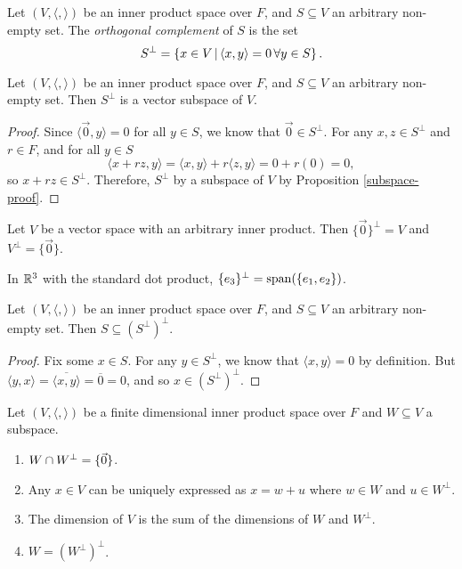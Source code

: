 \begin{defn}
    Let $(V, \langle,\rangle)$ be an inner product space over $F$, and $S \subseteq V$ an arbitrary non-empty set. The \emph{orthogonal complement} of $S$ is the set
    \[S^{\perp} = \left\{x \in V \,\middle|\, \langle x, y \rangle = 0 \,\forall y \in S \right\}.\]
\end{defn}

\begin{lemma}\label{orthogonal-complement-is-subspace}
    Let $(V, \langle,\rangle)$ be an inner product space over $F$, and $S \subseteq V$ an arbitrary non-empty set. Then $S^{\perp}$ is a vector subspace of $V$.
\end{lemma}

\begin{proof}
    Since $\langle \vec{0}, y \rangle = 0$ for all $y \in S$, we know that $\vec{0} \in S^{\perp}$. For any $x, z \in S^{\perp}$ and $r \in F$, and for all $y \in S$
    \[\langle x + rz, y \rangle = \langle x, y \rangle + r\langle z, y \rangle = 0 + r(0) = 0,\]
    so $x + rz \in S^{\perp}$. Therefore, $S^{\perp}$ by a subspace of $V$ by Proposition \ref{subspace-proof}.
\end{proof}

\begin{exmp}
    Let $V$ be a vector space with an arbitrary inner product. Then $\{\vec{0}\}^{\perp} = V$ and $V^{\perp} = \{\vec{0}\}$.
\end{exmp}

\begin{exmp}
    In $\mathbb{R}^3$ with the standard dot product, $\{e_3\}^{\perp} = \operatorname{span}(\{e_1, e_2\})$.
\end{exmp}

\begin{lemma}\label{orthogonal-complement-of-orthogonal-complement}
    Let $(V, \langle,\rangle)$ be an inner product space over $F$, and $S \subseteq V$ an arbitrary non-empty set. Then $S \subseteq \left(S^{\perp}\right)^{\perp}$.
\end{lemma}

\begin{proof}
    Fix some $x \in S$. For any $y \in S^{\perp}$, we know that $\langle x, y \rangle = 0$ by definition. But $\langle y, x \rangle = \overline{\langle x, y \rangle} = \overline{0} = 0$, and so $x \in \left(S^{\perp}\right)^{\perp}$.
\end{proof}

\begin{thm}
    Let $(V, \langle,\rangle)$ be a finite dimensional inner product space over $F$ and $W \subseteq V$ a subspace.
    \begin{enumerate}
        \item $W \cap W^{\perp} = \{\vec{0}\}$.
        \item Any $x \in V$ can be uniquely expressed as $x = w + u$ where $w \in W$ and $u \in W^{\perp}$.
        \item The dimension of $V$ is the sum of the dimensions of $W$ and $W^{\perp}$.
        \item $W = \left(W^{\perp}\right)^{\perp}$.
    \end{enumerate}
\end{thm}

